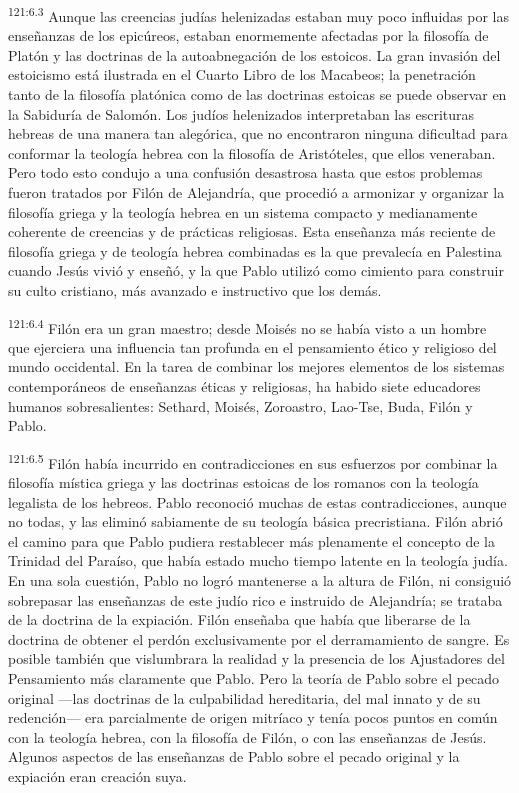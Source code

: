 \par
\textsuperscript{121:6.3} Aunque las creencias judías helenizadas estaban muy poco influidas por las enseñanzas de los epicúreos, estaban enormemente afectadas por la filosofía de Platón y las doctrinas de la autoabnegación de los estoicos. La gran invasión del estoicismo está ilustrada en el Cuarto Libro de los Macabeos; la penetración tanto de la filosofía platónica como de las doctrinas estoicas se puede observar en la Sabiduría de Salomón. Los judíos helenizados interpretaban las escrituras hebreas de una manera tan alegórica, que no encontraron ninguna dificultad para conformar la teología hebrea con la filosofía de Aristóteles, que ellos veneraban. Pero todo esto condujo a una confusión desastrosa hasta que estos problemas fueron tratados por Filón de Alejandría, que procedió a armonizar y organizar la filosofía griega y la teología hebrea en un sistema compacto y medianamente coherente de creencias y de prácticas religiosas. Esta enseñanza más reciente de filosofía griega y de teología hebrea combinadas es la que prevalecía en Palestina cuando Jesús vivió y enseñó, y la que Pablo utilizó como cimiento para construir su culto cristiano, más avanzado e instructivo que los demás.

\par
\textsuperscript{121:6.4} Filón era un gran maestro; desde Moisés no se había visto a un hombre que ejerciera una influencia tan profunda en el pensamiento ético y religioso del mundo occidental. En la tarea de combinar los mejores elementos de los sistemas contemporáneos de enseñanzas éticas y religiosas, ha habido siete educadores humanos sobresalientes: Sethard, Moisés, Zoroastro, Lao-Tse, Buda, Filón y Pablo.

\par
\textsuperscript{121:6.5} Filón había incurrido en contradicciones en sus esfuerzos por combinar la filosofía mística griega y las doctrinas estoicas de los romanos con la teología legalista de los hebreos. Pablo reconoció muchas de estas contradicciones, aunque no todas, y las eliminó sabiamente de su teología básica precristiana. Filón abrió el camino para que Pablo pudiera restablecer más plenamente el concepto de la Trinidad del Paraíso, que había estado mucho tiempo latente en la teología judía. En una sola cuestión, Pablo no logró mantenerse a la altura de Filón, ni consiguió sobrepasar las enseñanzas de este judío rico e instruido de Alejandría; se trataba de la doctrina de la expiación. Filón enseñaba que había que liberarse de la doctrina de obtener el perdón exclusivamente por el derramamiento de sangre. Es posible también que vislumbrara la realidad y la presencia de los Ajustadores del Pensamiento más claramente que Pablo. Pero la teoría de Pablo sobre el pecado original ---las doctrinas de la culpabilidad hereditaria, del mal innato y de su redención--- era parcialmente de origen mitríaco y tenía pocos puntos en común con la teología hebrea, con la filosofía de Filón, o con las enseñanzas de Jesús. Algunos aspectos de las enseñanzas de Pablo sobre el pecado original y la expiación eran creación suya.

